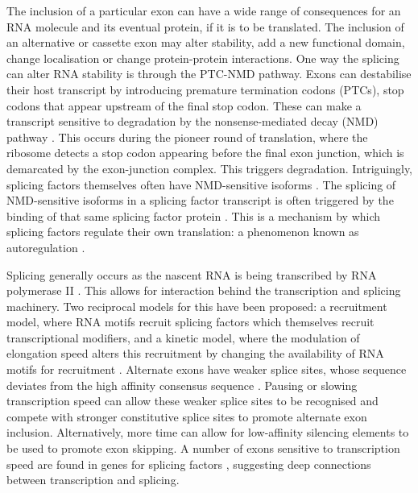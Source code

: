 The inclusion of a particular exon can have a wide range of consequences for an RNA molecule and its eventual protein, if it is to be translated. 
The inclusion of an alternative or cassette exon may alter stability, add a new functional domain, change localisation or change protein-protein interactions.
One way the splicing can alter RNA stability is through the PTC-NMD pathway.
Exons can destabilise their host transcript by introducing premature termination codons (PTCs), stop codons that appear upstream of the final stop codon. 
These can make a transcript sensitive to degradation by the nonsense-mediated decay (NMD) pathway \citep{McGlincy2008-wh}. 
This occurs during the pioneer round of translation, where the ribosome detects a stop codon appearing before the final exon junction, which is demarcated by the exon-junction complex.
This triggers degradation.  %
Intriguingly, splicing factors themselves often have NMD-sensitive isoforms \citep{Ni2007}. 
The splicing of NMD-sensitive isoforms in a splicing factor transcript is often triggered by the binding of that same splicing factor protein \citep{Jangi2014a}. 
This is a mechanism by which splicing factors regulate their own translation: a phenomenon known as autoregulation \citep{Rosenfeld2002}.

Splicing generally occurs as the nascent RNA is being transcribed by RNA polymerase II \citep{Beyer1988,Ameur2011}.
This allows for interaction behind the transcription and splicing machinery.
Two reciprocal models for this have been proposed: a recruitment model, where RNA motifs recruit splicing factors which themselves recruit transcriptional modifiers, and a kinetic model, where the modulation of elongation speed alters this recruitment by changing the availability of RNA motifs for recruitment \citep{Kornblihtt2004a}.
Alternate exons have weaker splice sites, whose sequence deviates from the high affinity consensus sequence \citep{Stamm2000}.
Pausing or slowing transcription speed can allow these weaker splice sites to be recognised and compete with stronger constitutive splice sites to promote alternate exon inclusion.
Alternatively, more time can allow for low-affinity silencing elements to be used to promote exon skipping.
A number of exons sensitive to transcription speed are found in genes for splicing factors \citep{Ip2011}, suggesting deep connections between transcription and splicing. 

